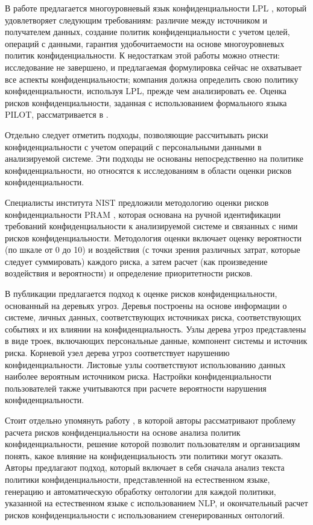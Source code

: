 \documentclass[../main]{subfiles}
\begin{document}
В работе \cite{MDPI15} предлагается многоуровневый язык конфиденциальности LPL \cite{MDPI15}, который удовлетворяет следующим требованиям: различие между источником и получателем данных, создание политик конфиденциальности с учетом целей, операций с данными, гарантия удобочитаемости на основе многоуровневых политик конфиденциальности. К недостаткам этой работы можно отнести: исследование не завершено, и предлагаемая формулировка сейчас не охватывает все аспекты конфиденциальности; компания должна определить свою политику конфиденциальности, используя LPL, прежде чем анализировать ее. Оценка рисков конфиденциальности, заданная с использованием формального языка PILOT, рассматривается в \cite{MDPI14}.

Отдельно следует отметить подходы, позволяющие рассчитывать риски конфиденциальности с учетом операций с персональными данными в анализируемой системе. Эти подходы не основаны непосредственно на политике конфиденциальности, но относятся к исследованиям в области оценки рисков конфиденциальности.

Специалисты института NIST предложили методологию оценки рисков конфиденциальности PRAM \cite{MDPI16}, которая основана на ручной идентификации требований конфиденциальности к анализируемой системе и связанных с ними рисков конфиденциальности. Методология оценки включает оценку вероятности (по шкале от 0 до 10) и воздействия (с точки зрения различных затрат, которые следует суммировать) каждого риска, а затем расчет (как произведение воздействия и вероятности) и определение приоритетности рисков.

В публикации \cite{MDPI17} предлагается подход к оценке рисков конфиденциальности, основанный на деревьях угроз. Деревья построены на основе информации о системе, личных данных, соответствующих источниках риска, соответствующих событиях и их влиянии на конфиденциальность. Узлы дерева угроз представлены в виде троек, включающих персональные данные, компонент системы и источник риска. Корневой узел дерева угроз соответствует нарушению конфиденциальности. Листовые узлы соответствуют использованию данных наиболее вероятным источником риска. Настройки конфиденциальности пользователей также учитываются при расчете вероятности нарушения конфиденциальности.

Стоит отдельно упомянуть работу \cite{P2Onto}, в которой авторы рассматривают проблему расчета рисков конфиденциальности на основе анализа политик конфиденциальности, решение которой позволит пользователям и организациям понять, какое влияние на конфиденциальность эти политики могут оказать. Авторы предлагают подход, который включает в себя сначала анализ текста политики конфиденциальности, представленной на естественном языке, генерацию и автоматическую обработку онтологии для каждой политики, указанной на естественном языке с использованием NLP, и окончательный расчет рисков конфиденциальности с использованием сгенерированных онтологий.
\end{document}
